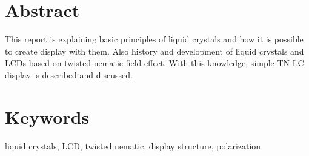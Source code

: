 \section*{Abstract}

This report is explaining basic principles of liquid crystals and how it is possible to create display with them. Also history and development of liquid crystals and LCDs  based on twisted nematic field effect. With this knowledge, simple TN LC display is described and discussed.

\vspace{50pt}

\section*{Keywords}
liquid crystals, LCD, twisted nematic, display structure, polarization
